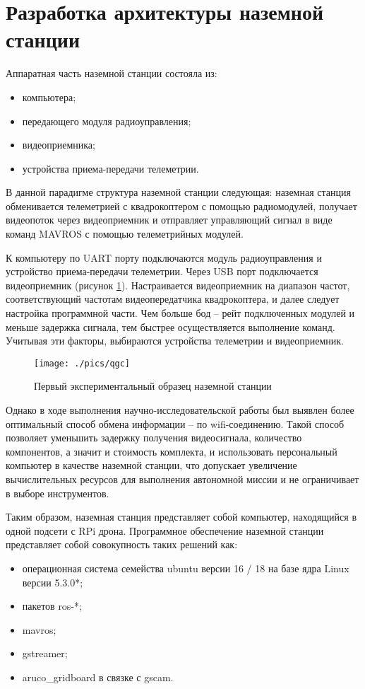 \section{Разработка архитектуры наземной станции}

Аппаратная часть наземной станции состояла из:
\begin{itemize}
	\item компьютера;
	\item передающего модуля радиоуправления;
	\item видеоприемника;
	\item устройства приема-передачи телеметрии.
\end{itemize}
В данной парадигме структура наземной станции следующая: наземная станция обменивается телеметрией с квадрокоптером с помощью радиомодулей, получает видеопоток через видеоприемник и отправляет управляющий сигнал в виде команд MAVROS с помощью телеметрийных модулей.
 
К компьютеру по UART порту подключаются модуль радиоуправления и устройство приема-передачи телеметрии. Через USB порт подключается видеоприемник (рисунок \ref{fig:ns}). Настраивается видеоприемник на диапазон частот, соответствующий частотам видеопередатчика квадрокоптера, и далее следует настройка программной части.
Чем больше бод -- рейт подключенных модулей и меньше задержка сигнала, тем быстрее осуществляется выполнение команд. Учитывая эти факторы, выбираются устройства телеметрии и видеоприемник.

\begin{figure}[H]
	\centering
	\texttt{[image: ./pics/qgc]}
	\caption{Первый экспериментальный образец наземной станции
	}
	\label{fig:ns} %
\end{figure}

Однако в ходе выполнения научно-исследовательской работы \cite{nir3} был выявлен более оптимальный способ обмена информации -- по wifi-соединению. Такой способ позволяет уменьшить задержку получения видеосигнала, количество компонентов, а значит и стоимость комплекта, и использовать персональный компьютер в качестве наземной станции, что допускает увеличение вычислительных ресурсов для выполнения автономной миссии и не ограничивает в выборе инструментов.

Таким образом, наземная станция представляет собой компьютер, находящийся в одной подсети с RPi дрона.
Программное обеспечение наземной станции представляет собой совокупность таких решений как:
\begin{itemize}
	\item операционная система семейства ubuntu версии 16 / 18 на базе ядра Linux версии 5.3.0*;
	\item пакетов ros-*;
	\item mavros;
	\item gstreamer;
	\item aruco\_gridboard в связке с gscam.
\end{itemize}


